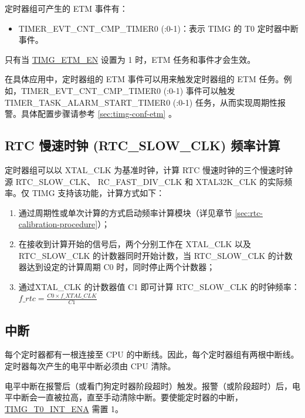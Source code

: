 \documentclass[main\_\_CN.tex]{subfiles}
\begin{document}
定时器组可产生的 ETM 事件有：

\begin{itemize}
\item TIMER\_EVT\_CNT\_CMP\_TIMER0 (:0-1)：表示 TIMG 的 T0 定时器中断事件。
\end{itemize}

只有当 \hyperref[fielddesc:TIMGETMEN]{TIMG\_ETM\_EN} 设置为 1 时，ETM 任务和事件才会生效。

在具体应用中，定时器组的 ETM 事件可以用来触发定时器组的 ETM 任务。例如，TIMER\_EVT\_CNT\_CMP\_TIMER0 (:0-1) 事件可以触发 TIMER\_TASK\_ALARM\_START\_TIMER0 (:0-1) 任务，从而实现周期性报警。具体配置步骤请参考 \ref{sec:timg-conf-etm} 。

\subsection{RTC 慢速时钟 (RTC\_SLOW\_CLK) 频率计算}\label{sec:rtc-calibration-desc}

定时器组可以以 XTAL\_CLK 为基准时钟，计算 RTC 慢速时钟的三个慢速时钟源 RTC\_SLOW\_CLK、 RC\_FAST\_DIV\_CLK 和 XTAL32K\_CLK 的实际频率。仅 TIMG 支持该功能，计算方式如下：

\begin{enumerate}
    \item 通过周期性或单次计算的方式启动频率计算模块（详见章节 \ref{sec:rtc-calibration-procedure}）；
    \item 在接收到计算开始的信号后，两个分别工作在 XTAL\_CLK 以及 RTC\_SLOW\_CLK 的计数器同时开始计数，当 RTC\_SLOW\_CLK 的计数器达到设定的计算周期 C0 时，同时停止两个计数器；
    \item 通过XTAL\_CLK 的计数器值 C1 即可计算 RTC\_SLOW\_CLK 的时钟频率：
    $f\_rtc = \frac{C0 \times f\_XTAL\_CLK}{C1}$
\end{enumerate}

\subsection{中断}\label{sec:timg-interrupt}

每个定时器都有一根连接至 CPU 的中断线。因此，每个定时器组有两根中断线。定时器每次产生的电平中断必须由 CPU 清除。

电平中断在报警后（或看门狗定时器阶段超时）触发。报警（或阶段超时）后，电平中断会一直被拉高，直至手动清除中断。要使能定时器的中断，\hyperref[fielddesc:TIMGT0INTENA]{TIMG\_T0\_INT\_ENA} 需置 1。
\end{document}
